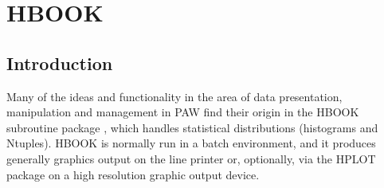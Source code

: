 
\chapter{HBOOK}
\label{sec:HBOOKH1}

\section{Introduction}
\label{sec:HBINTRO}

Many of the ideas and functionality in the area of data
presentation, manipulation and management in PAW find their origin
in the HBOOK subroutine package \cite{bib-HBOOK}, which
handles statistical distributions (histograms and Ntuples).
HBOOK is normally run in a batch environment, and it produces
generally graphics output on the line printer or, optionally, via
the HPLOT~\cite{bib-HPLOT} package
on a high resolution graphic output device.

